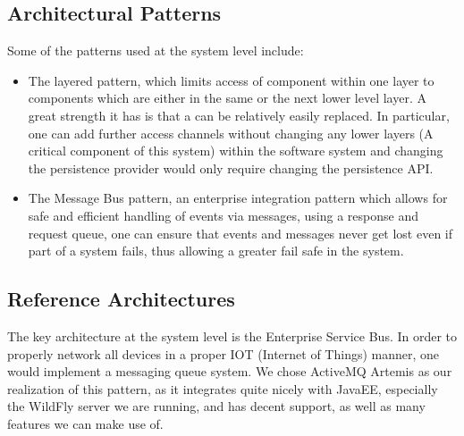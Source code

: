 \documentclass[11pt,a4paper]{article}
\begin{document}
\subsection{Architectural Patterns}
Some of the patterns used at the system level include:
\begin{itemize}
	\item The layered pattern, which limits access of component within one layer to components which are either in the same or the next lower level layer. A great strength it has is that a can be relatively easily replaced. In particular, one can add further access channels without changing any lower layers (A critical component of this system) within the software system and changing the persistence provider would only require changing the persistence API.
	\item The Message Bus pattern, an enterprise integration pattern which allows for safe and efficient handling of events via messages, using a response and request queue, one can ensure that events and messages never get lost even if part of a system fails, thus allowing a greater fail safe in the system.
\end{itemize}
\subsection{Reference Architectures}
The key architecture at the system level is the Enterprise Service Bus. In order to properly network all devices in a proper IOT (Internet of Things) manner, one would implement a messaging queue system. We chose ActiveMQ Artemis as our realization of this pattern, as it integrates quite nicely with JavaEE, especially the WildFly server we are running, and has decent support, as well as many features we can make use of.

\pagebreak

%
	
\end{document}
